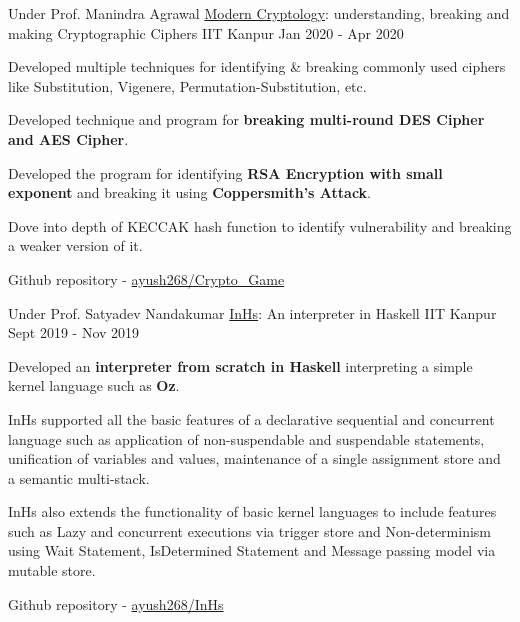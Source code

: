 \begin{cventries}


  \cventry
    {Under Prof. Manindra Agrawal} %
    {\href{https://github.com/ayush268/Crypto_Game}{Modern Cryptology}: understanding, breaking and making Cryptographic Ciphers} %
    {IIT Kanpur} %
    {Jan 2020 - Apr 2020} %
    {
      \begin{cvitems} %
      \item {Developed multiple techniques for identifying \& breaking commonly used ciphers like Substitution, Vigenere, Permutation-Substitution, etc.}
      \item {Developed technique and program for \textbf{breaking multi-round DES Cipher and AES Cipher}.}
      \item {Developed the program for identifying \textbf{RSA Encryption with small exponent} and breaking it using \textbf{Coppersmith’s Attack}.}
      \item {Dove into depth of KECCAK hash function to identify vulnerability and breaking a weaker version of it.}
      \item {Github repository - \href{https://github.com/ayush268/Crypto_Game}{ayush268/Crypto\_Game}}
      \end{cvitems}
    }


  \cventry
    {Under Prof. Satyadev Nandakumar} %
    {\href{https://github.com/ayush268/InHs}{InHs}: An interpreter in Haskell} %
    {IIT Kanpur} %
    {Sept 2019 - Nov 2019} %
    {
      \begin{cvitems} %
      \item {Developed an \textbf{interpreter from scratch in Haskell} interpreting a simple kernel language such as \textbf{Oz}.}
      \item {InHs supported all the basic features of a declarative sequential and concurrent language such as application of non-suspendable and suspendable statements, unification of variables and values, maintenance of a single assignment store and a semantic multi-stack.}
      \item {InHs also extends the functionality of basic kernel languages to include features such as Lazy and concurrent executions via trigger store and Non-determinism using Wait Statement, IsDetermined Statement and Message passing model via mutable store.}
      \item {Github repository - \href{https://github.com/ayush268/InHs}{ayush268/InHs}}
      \end{cvitems}
    }%


\end{cventries}

